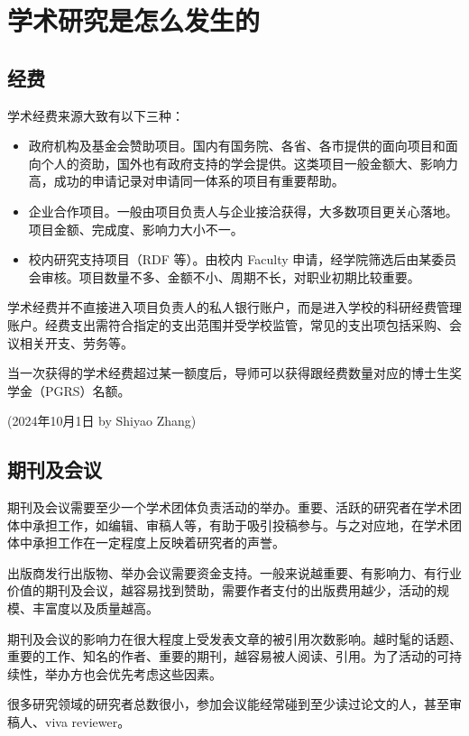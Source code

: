 \section{学术研究是怎么发生的}

\subsection{经费}
学术经费来源大致有以下三种：
\begin{itemize}
    \item 政府机构及基金会赞助项目。国内有国务院、各省、各市提供的面向项目和面向个人的资助，国外也有政府支持的学会提供。这类项目一般金额大、影响力高，成功的申请记录对申请同一体系的项目有重要帮助。
    \item 企业合作项目。一般由项目负责人与企业接洽获得，大多数项目更关心落地。项目金额、完成度、影响力大小不一。
    \item 校内研究支持项目（RDF 等）。由校内 Faculty 申请，经学院筛选后由某委员会审核。项目数量不多、金额不小、周期不长，对职业初期比较重要。
\end{itemize}

学术经费并不直接进入项目负责人的私人银行账户，而是进入学校的科研经费管理账户。经费支出需符合指定的支出范围并受学校监管，常见的支出项包括采购、会议相关开支、劳务等。

当一次获得的学术经费超过某一额度后，导师可以获得跟经费数量对应的博士生奖学金（PGRS）名额。

\begin{flushright}
    (2024年10月1日 by Shiyao Zhang)
\end{flushright}


\subsection{期刊及会议}
期刊及会议需要至少一个学术团体负责活动的举办。重要、活跃的研究者在学术团体中承担工作，如编辑、审稿人等，有助于吸引投稿参与。与之对应地，在学术团体中承担工作在一定程度上反映着研究者的声誉。

出版商发行出版物、举办会议需要资金支持。一般来说越重要、有影响力、有行业价值的期刊及会议，越容易找到赞助，需要作者支付的出版费用越少，活动的规模、丰富度以及质量越高。

期刊及会议的影响力在很大程度上受发表文章的被引用次数影响。越时髦的话题、重要的工作、知名的作者、重要的期刊，越容易被人阅读、引用。为了活动的可持续性，举办方也会优先考虑这些因素。

很多研究领域的研究者总数很小，参加会议能经常碰到至少读过论文的人，甚至审稿人、viva reviewer。

